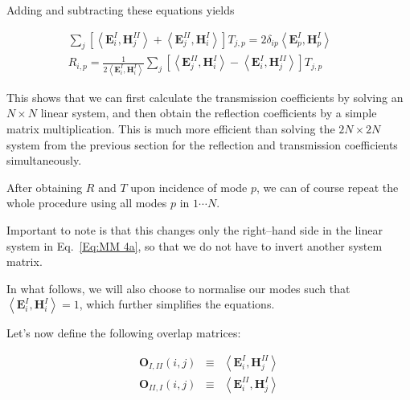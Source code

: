 Adding and subtracting these equations yields

\begin{eqnarray}
\sum _{j}\left[ \left\langle \mathbf{E}^{I}_{i},\mathbf{H}^{II}_{j}\right\rangle +\left\langle \mathbf{E}^{II}_{j},\mathbf{H}^{I}_{i}\right\rangle \right] T_{j,p}=2\delta _{ip}\left\langle \mathbf{E}^{I}_{p},\mathbf{H}^{I}_{p}\right\rangle  &  & \label{Eq:MM 4a} \\
R_{i,p}=\frac{1}{2\left\langle \mathbf{E}^{I}_{i},\mathbf{H}^{I}_{i}\right\rangle }\sum _{j}\left[ \left\langle \mathbf{E}^{II}_{j},\mathbf{H}^{I}_{i}\right\rangle -\left\langle \mathbf{E}^{I}_{i},\mathbf{H}^{II}_{j}\right\rangle \right] T_{j,p} &  & \label{Eq:MM 4b} 
\end{eqnarray}

This shows that we can first calculate the transmission coefficients by solving an $N \times N$ linear system, and then obtain the reflection coefficients by a simple matrix multiplication. This is much more efficient than solving the $2N \times 2N$ system from the previous section for the reflection and transmission coefficients simultaneously.

After obtaining $R$ and $T$ upon incidence of mode $p$, we can of course repeat the whole procedure using all modes $p$ in $ 1 \cdots N$.

\noindent{}Important to note is that this changes only the right--hand side in the linear system in Eq.~\ref{Eq:MM 4a}, so that we do not have to invert another system matrix. 

In what follows, we will also choose to normalise our modes such that \( \left\langle \mathbf{E}^{I}_{i},\mathbf{H}^{I}_{i}\right\rangle =1 \), which further simplifies the equations.

\pagebreak


Let's now define the following overlap matrices:

\begin{eqnarray}
\mathbf{O}_{I,II}\left( i,j\right)  & \equiv  & \left\langle \mathbf{E}^{I}_{i},\mathbf{H}^{II}_{j}\right\rangle \label{Eq:O_I_II} \\
\mathbf{O}_{II,I}\left( i,j\right)  & \equiv  & \left\langle \mathbf{E}^{II}_{i},\mathbf{H}^{I}_{j}\right\rangle \label{Eq:O_II_I} 
\end{eqnarray}

